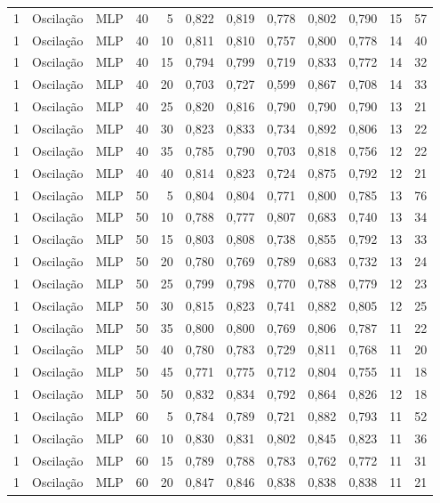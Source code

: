 \begin{longtable}{@{}rllrrrrrrrrr@{}}
1 & Oscilação & MLP & 40 & 5 & 0,822 & 0,819 & 0,778 & 0,802 & 0,790 & 15 & 57 \\
1 & Oscilação & MLP & 40 & 10 & 0,811 & 0,810 & 0,757 & 0,800 & 0,778 & 14 & 40 \\
1 & Oscilação & MLP & 40 & 15 & 0,794 & 0,799 & 0,719 & 0,833 & 0,772 & 14 & 32 \\
1 & Oscilação & MLP & 40 & 20 & 0,703 & 0,727 & 0,599 & 0,867 & 0,708 & 14 & 33 \\
1 & Oscilação & MLP & 40 & 25 & 0,820 & 0,816 & 0,790 & 0,790 & 0,790 & 13 & 21 \\
1 & Oscilação & MLP & 40 & 30 & 0,823 & 0,833 & 0,734 & 0,892 & 0,806 & 13 & 22 \\
1 & Oscilação & MLP & 40 & 35 & 0,785 & 0,790 & 0,703 & 0,818 & 0,756 & 12 & 22 \\
1 & Oscilação & MLP & 40 & 40 & 0,814 & 0,823 & 0,724 & 0,875 & 0,792 & 12 & 21 \\
1 & Oscilação & MLP & 50 & 5 & 0,804 & 0,804 & 0,771 & 0,800 & 0,785 & 13 & 76 \\
1 & Oscilação & MLP & 50 & 10 & 0,788 & 0,777 & 0,807 & 0,683 & 0,740 & 13 & 34 \\
1 & Oscilação & MLP & 50 & 15 & 0,803 & 0,808 & 0,738 & 0,855 & 0,792 & 13 & 33 \\
1 & Oscilação & MLP & 50 & 20 & 0,780 & 0,769 & 0,789 & 0,683 & 0,732 & 13 & 24 \\
1 & Oscilação & MLP & 50 & 25 & 0,799 & 0,798 & 0,770 & 0,788 & 0,779 & 12 & 23 \\
1 & Oscilação & MLP & 50 & 30 & 0,815 & 0,823 & 0,741 & 0,882 & 0,805 & 12 & 25 \\
1 & Oscilação & MLP & 50 & 35 & 0,800 & 0,800 & 0,769 & 0,806 & 0,787 & 11 & 22 \\
1 & Oscilação & MLP & 50 & 40 & 0,780 & 0,783 & 0,729 & 0,811 & 0,768 & 11 & 20 \\
1 & Oscilação & MLP & 50 & 45 & 0,771 & 0,775 & 0,712 & 0,804 & 0,755 & 11 & 18 \\
1 & Oscilação & MLP & 50 & 50 & 0,832 & 0,834 & 0,792 & 0,864 & 0,826 & 12 & 18 \\
1 & Oscilação & MLP & 60 & 5 & 0,784 & 0,789 & 0,721 & 0,882 & 0,793 & 11 & 52 \\
1 & Oscilação & MLP & 60 & 10 & 0,830 & 0,831 & 0,802 & 0,845 & 0,823 & 11 & 36 \\
1 & Oscilação & MLP & 60 & 15 & 0,789 & 0,788 & 0,783 & 0,762 & 0,772 & 11 & 31 \\
1 & Oscilação & MLP & 60 & 20 & 0,847 & 0,846 & 0,838 & 0,838 & 0,838 & 11 & 21 \\

\end{longtable}

